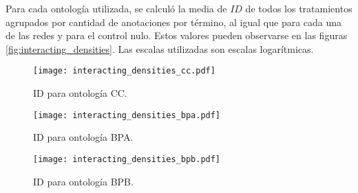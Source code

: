 Para cada ontología utilizada, se calculó la media de $ID$ de todos los tratamientos agrupados por cantidad de anotaciones por término, al igual que para cada una de las redes y para el control nulo. Estos valores pueden observarse en las figuras \ref{fig:interacting_densities}. Las escalas utilizadas son escalas logarítmicas. 
\begin{figure*}[t!]
    \centering
    \begin{subfigure}[t]{0.45\textwidth}
    \centering
    \texttt{[image: interacting\_densities\_cc.pdf]}
    \caption{ID para ontología CC.}
    \end{subfigure}
    \begin{subfigure}[t]{0.45\textwidth}
    \centering
    \texttt{[image: interacting\_densities\_bpa.pdf]}
    \caption{ID para ontología BPA.}
    \end{subfigure}
    \begin{subfigure}[t]{0.45\textwidth}
    \centering
    \texttt{[image: interacting\_densities\_bpb.pdf]}
    \caption{ID para ontología BPB.}
    \end{subfigure}    
    \caption{Densidad de interacción en función de la cantidad de anotaciones por término para $ds1$ (círculos rojos), $ds4$ (rombos violeta), PIN AI1 (triángulos rosa), PIN LCI (cruces verdes), KEGG (cruces azules) y control nulo (triángulos invertidos negros).}
    \label{fig:interacting_densities}
\end{figure*}

